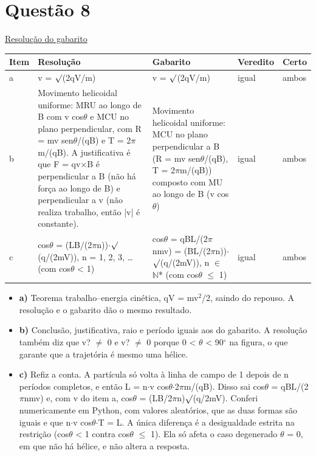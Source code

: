 \documentclass{article}%
\begin{document}
\section*{Questão 8}%
\href{https://poliedroresolve.sistemapoliedro.com.br/vestibulares/ita/2027/ita-2-fase-dia-3-22-10-2026-2-fase-dia-3/dissertativa-8-fisica-2-fase-dia-3-ita-2027}{Resolução do gabarito}\par\smallskip%
\begin{longtable}{@{}p{} p{} p{} p{} p{}@{}}\toprule Item & Resolução & Gabarito & Veredito & Certo \\ \midrule
a & v = $\surd$(2qV/m) & v = $\surd$(2qV/m) & igual & ambos \\
b & Movimento helicoidal uniforme: MRU ao longo de B com v cos$\theta$ e MCU no plano perpendicular, com R = mv sen$\theta$/(qB) e T = 2$\pi$m/(qB). A justificativa é que F = qv$\times$B é perpendicular a B (não há força ao longo de B) e perpendicular a v (não realiza trabalho, então |v| é constante). & Movimento helicoidal uniforme: MCU no plano perpendicular a B (R = mv sen$\theta$/(qB), T = 2$\pi$m/(qB)) composto com MU ao longo de B (v cos$\theta$) & igual & ambos \\
c & cos$\theta$ = (LB/(2$\pi$n))$\cdot$$\surd$(q/(2mV)), n = 1, 2, 3, \ldots{} (com cos$\theta$ < 1) & cos$\theta$ = qBL/(2$\pi$nmv) = (BL/(2$\pi$n))$\cdot$$\surd$(q/(2mV)), n $\in$ $\mathbb{N}$* (com cos$\theta$ $\leq$ 1) & igual & ambos \\
\bottomrule\end{longtable}%
\begin{itemize}%
\item%
\textbf{a)} Teorema trabalho--energia cinética, qV = mv$^2$/2, saindo do repouso. A resolução e o gabarito dão o mesmo resultado.%
\item%
\textbf{b)} Conclusão, justificativa, raio e período iguais aos do gabarito. A resolução também diz que v? $\neq$ 0 e v? $\neq$ 0 porque 0 < $\theta$ < 90$^\circ$ na figura, o que garante que a trajetória é mesmo uma hélice.%
\item%
\textbf{c)} Refiz a conta. A partícula só volta à linha de campo de 1 depois de n períodos completos, e então L = n$\cdot$v cos$\theta$$\cdot$2$\pi$m/(qB). Disso sai cos$\theta$ = qBL/(2$\pi$nmv) e, com v do item a, cos$\theta$ = (LB/2$\pi$n)$\surd$(q/2mV). Conferi numericamente em Python, com valores aleatórios, que as duas formas são iguais e que n$\cdot$v cos$\theta$$\cdot$T = L. A única diferença é a desigualdade estrita na restrição (cos$\theta$ < 1 contra cos$\theta$ $\leq$ 1). Ela só afeta o caso degenerado $\theta$ = 0, em que não há hélice, e não altera a resposta.%
\end{itemize}%
\end{document}
